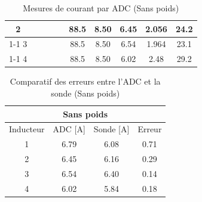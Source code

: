 \begin{table}[H]
{\begin{tabular}{|c|c|c|c|c|c|c|c|c|c|}
            2         &                                                            &                           &                                                         &                                                          & 88.5                                                    & 8.50                                                                & 6.45                                                  & 2.056  & 24.2                                                              \\ \cline{1-1} \cline{6-10}
            3         &                                                            &                           &                                                         &                                                          & 88.5                                                    & 8.50                                                                & 6.54                                                  & 1.964  & 23.1                                                              \\ \cline{1-1} \cline{6-10}
            4         &                                                            &                           &                                                         &                                                          & 88.5                                                    & 8.50                                                                & 6.02                                                  & 2.48   & 29.2                                                              \\ \hline
        \end{tabular}%
    }
    \caption{Mesures de courant par ADC (Sans poids)}
    \label{tab:sans_poids_adc}
\end{table}

\begin{table}[H]
    \centering
    \begin{tabular}{|c|c|c|c|}
        \hline
        \multicolumn{4}{|c|}{\textbf{Sans poids}}        \\ \hline
        Inducteur & ADC {[}A{]} & Sonde {[}A{]} & Erreur \\ \hline
        1         & 6.79        & 6.08          & 0.71   \\ \hline
        2         & 6.45        & 6.16          & 0.29   \\ \hline
        3         & 6.54        & 6.40          & 0.14   \\ \hline
        4         & 6.02        & 5.84          & 0.18   \\ \hline
    \end{tabular}
    \caption{Comparatif des erreurs entre l'ADC et la sonde (Sans poids)}
    \label{tab:sans_poids_comp}
\end{table}

